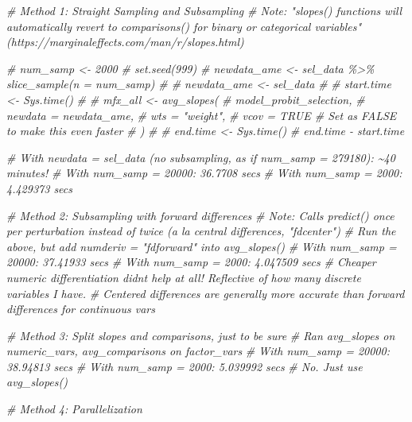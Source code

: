 \documentclass[
]{article}
\newenvironment{Shaded}{\begin{snugshade}}{\end{snugshade}}
\newcommand{\CommentTok}[1]{\textcolor[rgb]{0.56,0.35,0.01}{\textit{#1}}}
\begin{document}
\begin{Shaded}
\begin{Highlighting}[]
\CommentTok{\# Method 1: Straight Sampling and Subsampling }
\CommentTok{\# Note: "slopes() functions will automatically revert to comparisons() for binary or categorical variables" (https://marginaleffects.com/man/r/slopes.html)}

\CommentTok{\# num\_samp \textless{}{-} 2000}
\CommentTok{\# set.seed(999)}
\CommentTok{\# newdata\_ame \textless{}{-} sel\_data \%\textgreater{}\% slice\_sample(n = num\_samp)}
\CommentTok{\# \# newdata\_ame \textless{}{-} sel\_data}
\CommentTok{\# }
\CommentTok{\# start.time \textless{}{-} Sys.time()}
\CommentTok{\# }
\CommentTok{\# mfx\_all \textless{}{-} avg\_slopes(}
\CommentTok{\#   model\_probit\_selection,}
\CommentTok{\#   newdata = newdata\_ame,}
\CommentTok{\#   wts = "weight",}
\CommentTok{\#   vcov = TRUE \# Set as FALSE to make this even faster}
\CommentTok{\# )}
\CommentTok{\# }
\CommentTok{\# end.time \textless{}{-} Sys.time()}
\CommentTok{\# end.time {-} start.time}

\CommentTok{\# With newdata = sel\_data (no subsampling, as if num\_samp = 279180): \textasciitilde{}40 minutes!}
\CommentTok{\# With num\_samp = 20000: 36.7708 secs}
\CommentTok{\# With num\_samp = 2000: 4.429373 secs}

\CommentTok{\# Method 2: Subsampling with forward differences}
\CommentTok{\# Note: Calls predict() once per perturbation instead of twice (a la central differences, "fdcenter")}
\CommentTok{\# Run the above, but add numderiv = "fdforward" into avg\_slopes()}
\CommentTok{\# With num\_samp = 20000: 37.41933 secs}
\CommentTok{\# With num\_samp = 2000: 4.047509 secs}
\CommentTok{\# Cheaper numeric differentiation didn\textquotesingle{}t help at all! Reflective of how many discrete variables I have.}
\CommentTok{\# Centered differences are generally more accurate than forward differences for continuous vars}

\CommentTok{\# Method 3: Split slopes and comparisons, just to be sure}
\CommentTok{\# Ran avg\_slopes on numeric\_vars, avg\_comparisons on factor\_vars}
\CommentTok{\# With num\_samp = 20000: 38.94813 secs}
\CommentTok{\# With num\_samp = 2000: 5.039992 secs}
\CommentTok{\# No. Just use avg\_slopes()}


\CommentTok{\# Method 4: Parallelization}


\end{Highlighting}
\end{Shaded}
\end{document}
